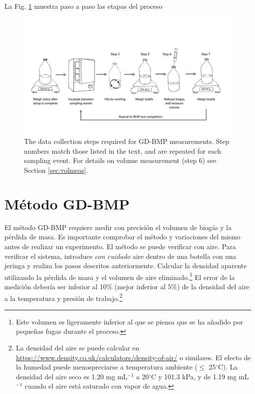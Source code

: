 \documentclass[]{article}
\begin{document}
La Fig. \ref{fig:steps} muestra paso a paso las etapas del proceso

\begin{figure}[ht]
  \includegraphics[width=\textwidth]{figs/GD_steps.pdf}
  \caption{The data collection steps required for GD-BMP measurements. Step numbers match those listed in the text, and are repeated for each sampling event. For details on volume measurement (step 6) see Section \ref{sec:volmeas}.}
  \label{fig:steps}
\end{figure}


\section{Método GD-BMP}
El método GD-BMP requiere medir con precisión el volumen de biogás y la pérdida de masa.
Es importante comprobar el método y variaciones del mismo antes de realizar un experimento.
El método se puede verificar con aire.
Para verificar el sistema, introduce \textit{con cuidado} aire dentro de una botella con una jeringa y realiza los pasos descritos anteriormente. 
Calcular la densidad aparente utilizando la pérdida de masa y el volumen de aire eliminado.\footnote{Este volumen es ligeramente inferior al que se piensa que se ha añadido por pequeñas fugas durante el proceso.}
El error de la medición debería ser inferior al 10\% (mejor inferior al 5\%) de la densidad del aire a la temperatura y presión de trabajo.\footnote{La densidad del aire se puede calcular en  \url{https://www.density.co.uk/calculators/density-of-air/} o similares. El efecto de la humedad puede menospreciarse a temperatura ambiente ($\le$ 25$^\circ$C). La densidad del aire seco es 1.20 mg mL$^{-1}$ a 20$^\circ$C y 101.3 kPa, y de 1.19 mg mL$^{-1}$ cuando el aire está saturado con vapor de agua.}
\end{document}
